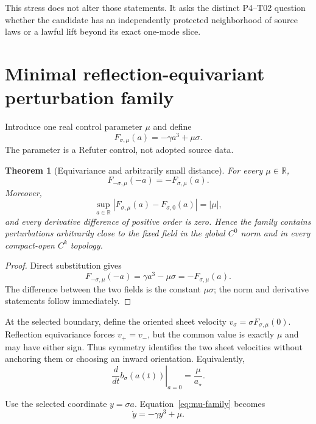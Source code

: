 \documentclass[11pt]{article}
\newtheorem{theorem}{Theorem}
\newcommand{\R}{\mathbb R}
\begin{document}
This stress does not alter those statements.  It asks the distinct P4--T02
question whether the candidate has an independently protected neighborhood of
source laws or a lawful lift beyond its exact one-mode slice.

\section{Minimal reflection-equivariant perturbation family}

Introduce one real control parameter $\mu$ and define
\begin{equation}
 F_{\sigma,\mu}(a)=-\gamma a^3+\mu\sigma.
 \label{eq:mu-family}
\end{equation}
The parameter is a Refuter control, not adopted source data.

\begin{theorem}[Equivariance and arbitrarily small distance]
\label{thm:equivariance}
For every $\mu\in\R$,
\[
 F_{-\sigma,\mu}(-a)=-F_{\sigma,\mu}(a).
\]
Moreover,
\[
 \sup_{a\in\R}|F_{\sigma,\mu}(a)-F_{\sigma,0}(a)|=|\mu|,
\]
and every derivative difference of positive order is zero.  Hence the family
contains perturbations arbitrarily close to the fixed field in the global
$C^0$ norm and in every compact-open $C^k$ topology.
\end{theorem}

\begin{proof}
Direct substitution gives
\[
 F_{-\sigma,\mu}(-a)=\gamma a^3-\mu\sigma
 =-F_{\sigma,\mu}(a).
\]
The difference between the two fields is the constant $\mu\sigma$; the norm
and derivative statements follow immediately.
\end{proof}

At the selected boundary, define the oriented sheet velocity
$v_\sigma=\sigma F_{\sigma,\mu}(0)$.  Reflection equivariance forces
$v_+=v_-$, but the common value is exactly $\mu$ and may have either sign.
Thus symmetry identifies the two sheet velocities without anchoring them or
choosing an inward orientation.  Equivalently,
\[
 \left.\frac{d}{dt}b_\sigma(a(t))\right|_{a=0}
 =\frac{\mu}{a_\star}.
\]

Use the selected coordinate $y=\sigma a$.  Equation~\eqref{eq:mu-family}
becomes
\begin{equation}
 \dot y=-\gamma y^3+\mu.
 \label{eq:y-family}
\end{equation}
\end{document}
